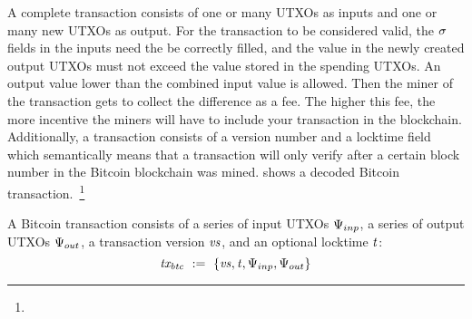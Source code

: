 \begin{center}
    \fbox{
    \begin{varwidth}{\textwidth}
        \procedure[linenumbering]{$\procCreateUTXO{\varValue}{\varScriptPubKey}$} {
        \pcreturn \varUTXO \opAssign \{ \varValue \opAssign \varValue, \varScriptPubKey \opAssign \varScriptPubKey,
        \varScriptSig \opAssign \cnstEmptySet \}
        } \par
        \procedure[linenumbering]{$\procSpendUTXO{\varUTXO}{\varScriptSig}$} {
        \{ \varValue, \varScriptPubKey \} \opFunResult \varUTXO \\
        \pcreturn \varUTXO \opAssign \{ \varValue \opAssign \varValue, \varScriptPubKey \opAssign \varScriptPubKey,
        \varScriptSig \opAssign \varScriptSig \}
        } \par
        \procedure[linenumbering]{$\procVerfUTXO{\varUTXO}$} {
        \{ \varValue, \varScriptPubKey, \varScriptSig \} \opFunResult \varUTXO \\
        \pcreturn \procVerf{\varScriptPubKey}{\varScriptSig}{\varValue}
        }
    \end{varwidth}
    }
\end{center}

A complete transaction consists of one or many UTXOs as inputs and one or many new UTXOs as output.
For the transaction to be considered valid, the $\mathit{\sigma}$ fields in the inputs need the be correctly filled, and the value in the newly created output UTXOs must not exceed the value stored in the spending UTXOs.
An output value lower than the combined input value is allowed.
Then the miner of the transaction gets to collect the difference as a fee.
The higher this fee, the more incentive the miners will have to include your transaction in the blockchain.
Additionally, a transaction consists of a version number and a locktime field which semantically means that a transaction will only verify after a certain block number in the Bitcoin blockchain was mined.
 shows a decoded Bitcoin transaction.~\footnote{\urlbtcbook}

\begin{definition}
    A Bitcoin transaction consists of a series of input UTXOs $\Psi_{inp}$, a series of output UTXOs $\Psi_{out}$, a
    transaction version $\mathit{vs}$, and an optional locktime $\mathit{t}$:
    \[ \mathit{tx_{btc}} ~:=~ \{ \mathit{vs}, \mathit{t}, \Psi_{inp}, \Psi_{out} \} \]
\end{definition}

